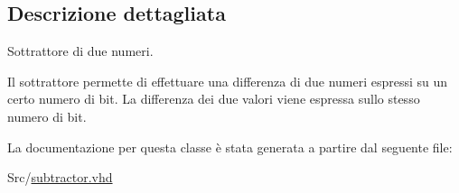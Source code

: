 \subsection{Descrizione dettagliata}
Sottrattore di due numeri. 

Il sottrattore permette di effettuare una differenza di due numeri espressi su un certo numero di bit. La differenza dei due valori viene espressa sullo stesso numero di bit. 

La documentazione per questa classe è stata generata a partire dal seguente file\+:\begin{DoxyCompactItemize}
\item 
Src/\hyperlink{subtractor_8vhd}{subtractor.\+vhd}\end{DoxyCompactItemize}

